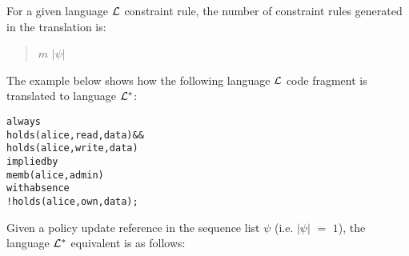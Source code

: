 \documentclass[global,twocolumn,final]{svjour}
\newenvironment{vverbatim}
  {\begin{alltt}}
  {\vspace{-\baselineskip}\end{alltt}}
\begin{document}
          For a given language ${\cal L}$ constraint rule, the number of
          constraint rules generated in the translation is:

          \begin{quote}
            $m$ $|\psi|$
          \end{quote}

          The example below shows how the following language ${\cal L}$ code
          fragment is translated to language ${\cal L}^{*}$:

          \begin{vverbatim}
  always
    holds(alice, read, data) &&
    holds(alice, write, data)
  implied by
    memb(alice, admin)
  with absence
    !holds(alice, own, data);
          \end{vverbatim}

          Given a policy update reference in the sequence list $\psi$ (i.e.
          $|\psi|$ $=$ $1$), the language ${\cal L}^{*}$ equivalent is as
          follows:
\end{document}
